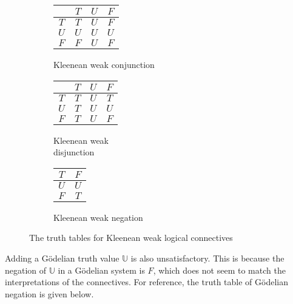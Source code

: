 \documentclass[12pt]{article}
\begin{document}
\begin{figure}[h!]
    \centering
    \begin{subfigure}{0.3\textwidth}
        \centering
            \begin{tabular}{ c | c | c | c }
                & $T$ & $U$ & $F$ \\
                \hline
                $T$ & $T$ & $U$ & $F$ \\
                \hline
                $U$ & $U$ & $U$ & $U$ \\
                \hline
                $F$ & $F$ & $U$ & $F$ \\
            \end{tabular}
            \caption{Kleenean weak conjunction}
            \label{KleeneWeakAnd}
    \end{subfigure}
    \begin{subfigure}{0.3\textwidth}
        \centering
            \begin{tabular}{ c | c | c | c }
                & $T$ & $U$ & $F$ \\
                \hline
                $T$ & $T$ & $U$ & $T$ \\
                \hline
                $U$ & $T$ & $U$ & $U$ \\
                \hline
                $F$ & $T$ & $U$ & $F$ \\
            \end{tabular}
            \caption{Kleenean weak \\ disjunction}
            \label{KleeneWeakOr}
    \end{subfigure}
    \begin{subfigure}{0.3\textwidth}
        \centering
            \begin{tabular}{ c | c }
                $T$ & $F$ \\
                \hline
                $U$ & $U$ \\
                \hline
                $F$ & $T$ \\
            \end{tabular}
            \caption{Kleenean weak negation}
            \label{KleeneWeakNot}
    \end{subfigure}
    \caption{The truth tables for Kleenean weak logical connectives}

\end{figure}
Adding a G\"{o}delian truth value $\mathbb{U}$ is also unsatisfactory. This is because the negation of $\mathbb{U}$ in a G\"{o}delian system is
$F$, which does not seem to match the interpretations of the connectives. For reference, the truth table of G\"{o}delian negation is given below. 
\end{document}
